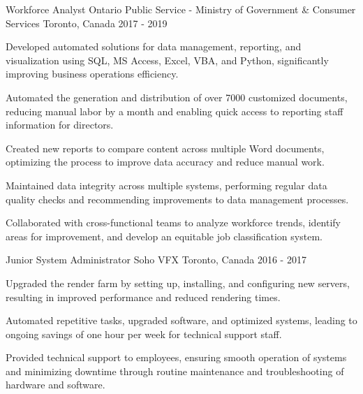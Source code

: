 \begin{cventries}
\cventry
	{Workforce Analyst}
	{Ontario Public Service - Ministry of Government \& Consumer Services}
	{Toronto, Canada}
	{2017 - 2019}
	{
		\begin{cvitems}
			\item Developed automated solutions for data management, reporting, and visualization using SQL, MS Access, Excel, VBA, and Python, significantly improving business operations efficiency.
			\item Automated the generation and distribution of over 7000 customized documents, reducing manual labor by a month and enabling quick access to reporting staff information for directors.
			\item Created new reports to compare content across multiple Word documents, optimizing the process to improve data accuracy and reduce manual work.
			\item Maintained data integrity across multiple systems, performing regular data quality checks and recommending improvements to data management processes.
			\item Collaborated with cross-functional teams to analyze workforce trends, identify areas for improvement, and develop an equitable job classification system.
		\end{cvitems}
	}

\cventry
	{Junior System Administrator}
	{Soho VFX}
	{Toronto, Canada}
	{2016 - 2017}
	{
		\begin{cvitems}
			\item Upgraded the render farm by setting up, installing, and configuring new servers, resulting in improved performance and reduced rendering times.
			\item Automated repetitive tasks, upgraded software, and optimized systems, leading to ongoing savings of one hour per week for technical support staff.
			\item Provided technical support to employees, ensuring smooth operation of systems and minimizing downtime through routine maintenance and troubleshooting of hardware and software.
		\end{cvitems}
	}

\end{cventries}
